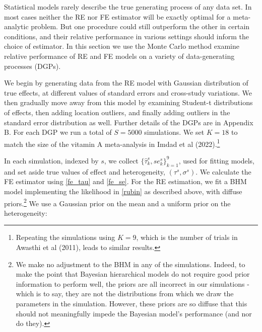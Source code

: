 \documentclass[12pt]{article}
\begin{document}
Statistical models rarely describe the true generating process of any data set. In most cases neither the RE nor FE estimator will be exactly optimal for a meta-analytic problem. But one procedure could still outperform the other in certain conditions, and their relative performance in various settings should inform the choice of estimator. In this section we use the Monte Carlo method examine relative performance of RE and FE models on a variety of data-generating processes (DGPs).

We begin by generating data from the RE model with Gaussian distribution of true effects, at different values of standard errors and cross-study variations. We then gradually move away from this model by examining Student-t distributions of effects, then adding location outliers, and finally adding outliers in the standard error distribution as well. Further details of the DGPs are in Appendix B. For each DGP we run a total of $S = 5000$ simulations. We set $K=18$ to match the size of the vitamin A meta-analysis in Imdad et al (2022).\footnote{Repeating the simulations using $K=9$, which is the number of trials in Awasthi et al (2011), leads to similar results.}

In each simulation, indexed by $s$, we collect $\{\hat{\tau}_k^s, se_k^s\}_{k=1}^9$, used for fitting models, and set aside true values of effect and heterogeneity, $(\tau^{s}, \sigma^{s})$. We calculate the FE estimator using \eqref{fe_tau} and \eqref{fe_se}. For the RE estimation, we fit a BHM model implementing the likelihood in \eqref{rubin} as described above, with diffuse priors.\footnote{We make no adjustment to the BHM in any of the simulations. Indeed, to make the point that Bayesian hierarchical models do not require good prior information to perform well, the priors are all incorrect in our simulations - which is to say, they are not the distributions from which we draw the parameters in the simulation. However, these priors are so diffuse that this should not meaningfully impede the Bayesian model's performance (and nor do they).} We use a Gaussian prior on the mean and a uniform prior on the heterogeneity:

% 
% 
\end{document}
